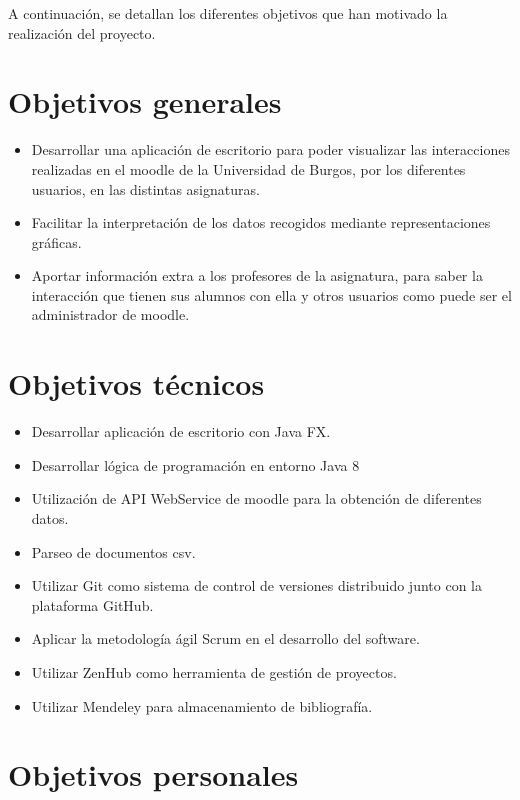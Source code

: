 

A continuación, se detallan los diferentes objetivos que han motivado la
realización del proyecto.

\section{Objetivos generales}\label{objetivos-generales}

\begin{itemize}
	\tightlist
	\item
	Desarrollar una aplicación de escritorio para poder visualizar las interacciones realizadas en el moodle de la Universidad de Burgos, por los diferentes usuarios, en las distintas asignaturas.
	\item
	Facilitar la interpretación de los datos recogidos mediante
	representaciones gráficas.
	\item
	Aportar información extra a los profesores de la asignatura, para saber la interacción que tienen sus alumnos con ella y otros usuarios como puede ser el administrador de moodle.
	
\end{itemize}

\section{Objetivos técnicos}\label{objetivos-tecnicos}

\begin{itemize}
	\tightlist
	\item
	Desarrollar aplicación de escritorio con Java FX.
	\item
	Desarrollar lógica de programación en entorno Java 8
	\item
	Utilización de API WebService de moodle para la obtención de diferentes datos.
	\item
	Parseo de documentos csv.
	\item
	Utilizar Git como sistema de control de versiones distribuido junto
	con la plataforma GitHub.
	\item
	Aplicar la metodología ágil Scrum en el desarrollo del software.
	\item
	Utilizar ZenHub como herramienta de gestión de proyectos.
	\item
	Utilizar Mendeley para almacenamiento de bibliografía.
\end{itemize}

\section{Objetivos personales}\label{objetivos-personales}

